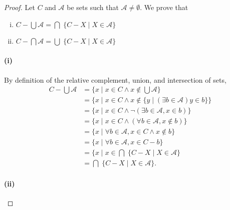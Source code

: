 \documentclass{report}
\begin{document}
\begin{proof}

  Let $C$ and $\mathscr{A}$ be sets such that $\mathscr{A} \neq \emptyset$.
  We prove that
    \begin{enumerate}[(i)]
      \item $C - \bigcup \mathscr{A} =
        \bigcap\; \{ C - X \mid X \in \mathscr{A} \}$
      \item $C - \bigcap \mathscr{A} =
          \bigcup\; \{ C - X \mid X \in \mathscr{A} \}$
    \end{enumerate}

  \paragraph{(i)}%

    By definition of the relative complement, union, and intersection of sets,
      \begin{align*}
        C - \bigcup \mathscr{A}
          & = \{ x \mid x \in C \land x \not\in \bigcup \mathscr{A} \} \\
          & = \{ x \mid x \in C \land
            x \not\in \{ y \mid (\exists b \in \mathscr{A}) y \in b \}\} \\
          & = \{ x \mid x \in C \land
            \neg(\exists b \in \mathscr{A}, x \in b) \} \\
          & = \{ x \mid x \in C \land
            (\forall b \in \mathscr{A}, x \not\in b) \} \\
          & = \{ x \mid
            \forall b \in \mathscr{A}, x \in C \land x \not\in b \} \\
          & = \{ x \mid \forall b \in \mathscr{A}, x \in C - b \} \\
          & = \{ x \mid x \in \bigcap\; \{ C - X \mid X \in \mathscr{A} \} \\
          & = \bigcap\; \{ C - X \mid X \in \mathscr{A} \}.
      \end{align*}

  \paragraph{(ii)}%


\end{proof}
\end{document}
